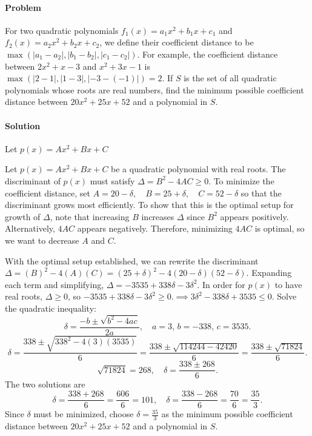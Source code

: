 \documentclass[10pt]{article}
\theoremstyle{plain}
\theoremstyle{definition}
\theoremstyle{remark}
\begin{document}
\paragraph{Problem} For two quadratic polynomials \(f_1(x)=a_1x^2+b_1x+c_1\) and \(f_2(x)=a_2x^2+b_2x+c_2\), we define their coefficient distance to be \(\max(|a_1-a_2|, |b_1-b_2|, |c_1-c_2|)\). For example, the coefficient distance between \(2x^2+x-3\) and \(x^2+3x-1\) is \(\max(|2-1|, |1-3|, |-3-(-1)|)=2\). If \(S\) is the set of all quadratic polynomials whose roots are real numbers, find the minimum possible coefficient distance between \(20x^2+25x+52\) and a polynomial in \(S\). \

\paragraph{Solution} Let \(p(x)=Ax^2+Bx+C\)

Let \(p(x) = Ax^2 + Bx + C\) be a quadratic polynomial with real roots. The discriminant of \(p(x)\) must satisfy \(\Delta = B^2 - 4AC \geqslant 0\). To minimize the coefficient distance, set \(A = 20 - \delta, \quad B = 25 + \delta, \quad C = 52 - \delta\) so that the discriminant grows most efficiently. To show that this is the optimal setup for growth of \(\Delta\), note that increasing \(B\) increases \(\Delta\) since \(B^2\) appears positively. Alternatively, \(4AC\) appears negatively. Therefore, minimizing \(4AC\) is optimal, so we want to decrease \(A\) and \(C\).

With the optimal setup established, we can rewrite the discriminant \(\Delta = (B)^2 - 4(A)(C) = (25 + \delta)^2 - 4(20 - \delta)(52 - \delta).\)
Expanding each term and simplifying, \(\Delta = -3535 + 338\delta - 3\delta^2.\) In order for \(p(x)\) to have real roots, \(\Delta \geqslant 0\), so \(-3535 + 338\delta - 3\delta^2 \geqslant 0.\implies 3\delta^2 - 338\delta + 3535 \leqslant 0.\)
Solve the quadratic inequality:
\[
\delta = \frac{-b \pm \sqrt{b^2 - 4ac}}{2a}, \quad a = 3, \, b = -338, \, c = 3535.
\]
\[
\delta = \frac{338 \pm \sqrt{338^2 - 4(3)(3535)}}{6} = \frac{338 \pm \sqrt{114244 - 42420}}{6} = \frac{338 \pm \sqrt{71824}}{6}.
\]
\[
\sqrt{71824} = 268, \quad \delta = \frac{338 \pm 268}{6}.
\]
The two solutions are
\[
\delta = \frac{338 + 268}{6} = \frac{606}{6} = 101, \quad \delta = \frac{338 - 268}{6} = \frac{70}{6} = \frac{35}{3}.
\]
Since \(\delta\) must be minimized, choose \(\delta = \boxed{\frac{35}{3}}\) as the minimum possible coefficient distance between \(20x^2+25x+52\) and a polynomial in \(S\).
\end{document}
